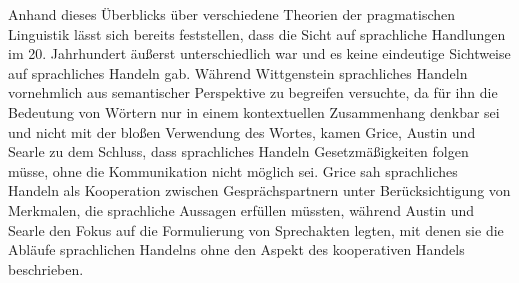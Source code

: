 Anhand dieses Überblicks über verschiedene Theorien der pragmatischen Linguistik lässt sich bereits feststellen, dass die Sicht auf sprachliche Handlungen im 20. Jahrhundert äußerst
unterschiedlich war und es keine eindeutige Sichtweise auf sprachliches Handeln gab.
Während Wittgenstein sprachliches Handeln vornehmlich aus semantischer Perspektive zu begreifen versuchte, da für ihn die Bedeutung von Wörtern nur in einem kontextuellen Zusammenhang denkbar sei und nicht mit der bloßen Verwendung des Wortes, kamen Grice, Austin und Searle zu dem Schluss, dass sprachliches Handeln Gesetzmäßigkeiten folgen müsse, ohne die Kommunikation nicht möglich sei.
Grice sah sprachliches Handeln als Kooperation zwischen Gesprächspartnern unter Berücksichtigung von Merkmalen, die sprachliche Aussagen erfüllen müssten, während Austin und Searle den Fokus auf die Formulierung von Sprechakten legten, mit denen sie die Abläufe sprachlichen Handelns ohne den Aspekt des kooperativen Handels beschrieben.

